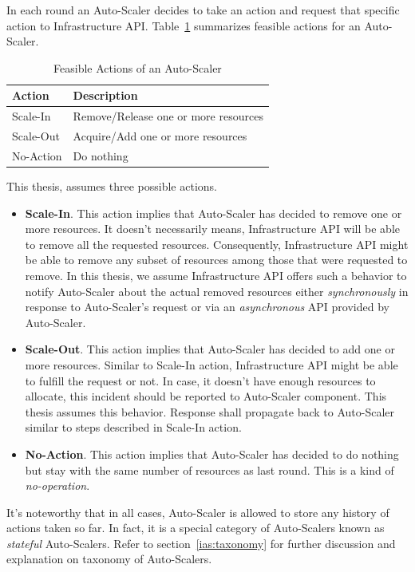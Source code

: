 In each round an Auto-Scaler decides to take an action and request that specific action to Infrastructure API. Table~\ref{tab:actions-sum} summarizes feasible actions for an Auto-Scaler.
\begin{table}[h!]
    \begin{tabular}{ll}
        \toprule
        \textbf{Action} & \textbf{Description}\\
        \midrule
        Scale-In & Remove/Release one or more resources\\
        Scale-Out & Acquire/Add one or more resources\\
        No-Action & Do nothing\\
        \bottomrule
    \end{tabular}
    \centering
    \caption{Feasible Actions of an Auto-Scaler}
    \label{tab:actions-sum}
\end{table}
This thesis, assumes three possible actions.
\begin{itemize}
    \item \textbf{Scale-In}. This action implies that Auto-Scaler has decided to remove one or more resources. It doesn't necessarily means, Infrastructure API will be able to remove all the requested resources. Consequently, Infrastructure API might be able to remove any subset of resources among those that were requested to remove. In this thesis, we assume Infrastructure API offers such a behavior to notify Auto-Scaler about the actual removed resources either \emph{synchronously} in response to Auto-Scaler's request or via an \emph{asynchronous} API provided by Auto-Scaler.
    \item \textbf{Scale-Out}. This action implies that Auto-Scaler has decided to add one or more resources. Similar to Scale-In action, Infrastructure API might be able to fulfill the request or not. In case, it doesn't have enough resources to allocate, this incident should be reported to Auto-Scaler component. This thesis assumes this behavior. Response shall propagate back to Auto-Scaler similar to steps described in Scale-In action.
    \item \textbf{No-Action}. This action implies that Auto-Scaler has decided to do nothing but stay with the same number of resources as last round. This is a kind of \emph{no-operation}.
\end{itemize}
It's noteworthy that in all cases, Auto-Scaler is allowed to store any history of actions taken so far. In fact, it is a special category of Auto-Scalers known as \emph{stateful} Auto-Scalers. Refer to section~\ref{ias:taxonomy} for further discussion and explanation on taxonomy of Auto-Scalers.

